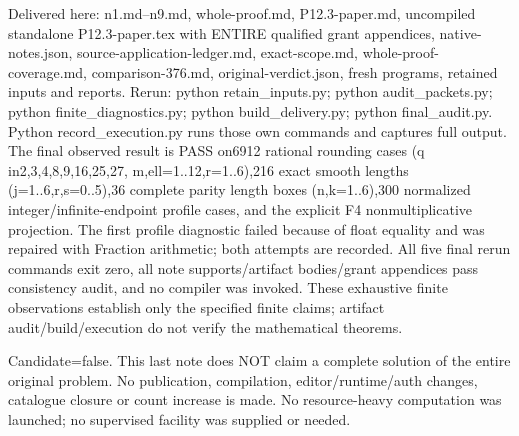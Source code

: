 \documentclass[11pt]{article}
\begin{document}
\begin{OwnProofBody}
Delivered here: n1.md--n9.md, whole-proof.md, P12.3-paper.md, uncompiled standalone P12.3-paper.tex with ENTIRE qualified grant appendices, native-notes.json, source-application-ledger.md, exact-scope.md, whole-proof-coverage.md, comparison-376.md, original-verdict.json, fresh programs, retained inputs and reports. Rerun: python retain_inputs.py; python audit_packets.py; python finite_diagnostics.py; python build_delivery.py; python final_audit.py. Python record_execution.py runs those own commands and captures full output. The final observed result is PASS on6912 rational rounding cases (q in{2,3,4,8,9,16,25,27}, m,ell=1..12,r=1..6),216 exact smooth lengths (j=1..6,r,s=0..5),36 complete parity length boxes (n,k=1..6),300 normalized integer/infinite-endpoint profile cases, and the explicit F4 nonmultiplicative projection. The first profile diagnostic failed because of float equality and was repaired with Fraction arithmetic; both attempts are recorded. All five final rerun commands exit zero, all note supports/artifact bodies/grant appendices pass consistency audit, and no compiler was invoked. These exhaustive finite observations establish only the specified finite claims; artifact audit/build/execution do not verify the mathematical theorems.

Candidate=false. This last note does NOT claim a complete solution of the entire original problem. No publication, compilation, editor/runtime/auth changes, catalogue closure or count increase is made. No resource-heavy computation was launched; no supervised facility was supplied or needed.

\end{OwnProofBody}
\end{document}
